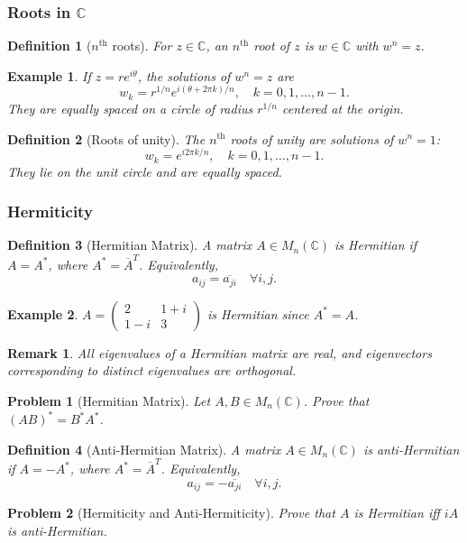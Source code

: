 \documentclass{article}
\newtheorem{definition}{Definition}
\newtheorem{problem}{Problem}
\newtheorem*{example}{Example}
\newtheorem{remark}{Remark}
\begin{document}
\subsubsection{Roots in $\mathbb{C}$}
\begin{definition}[$n^{\text{th}}$ roots]
    For $z \in \mathbb{C}$, an $n^{\text{th}}$ root of $z$ is $w \in \mathbb{C}$ with $w^n = z$.
\end{definition}
\begin{example}
    If $z = re^{i\theta}$, the solutions of $w^n = z$ are
    \[w_k = r^{1/n} e^{i(\theta + 2\pi k)/n}, \quad k = 0,1,\ldots,n-1.\]
    They are equally spaced on a circle of radius $r^{1/n}$ centered at the origin.
\end{example}
\begin{definition}[Roots of unity]
    The $n^{\text{th}}$ roots of unity are solutions of $w^n = 1$:
    \[w_k = e^{i2\pi k/n}, \quad k = 0,1,\ldots,n-1.\]
    They lie on the unit circle and are equally spaced.
\end{definition}

\subsubsection{Hermiticity}
\begin{definition}[Hermitian Matrix]
    A matrix $A \in M_n(\mathbb{C})$ is Hermitian if $A = A^\ast$, where $A^\ast = \overline{A}^T$. Equivalently,
    \[a_{ij} = \overline{a_{ji}} \quad \forall i,j.\]
\end{definition}
\begin{example}
    $A = \begin{pmatrix}2 & 1+i \\ 1-i & 3\end{pmatrix}$ is Hermitian since $A^\ast = A$.
\end{example}
\begin{remark}
    All eigenvalues of a Hermitian matrix are real, and eigenvectors corresponding to distinct eigenvalues are orthogonal.
\end{remark}
\begin{problem}[Hermitian Matrix]
    Let $A,B \in M_n(\mathbb{C})$. Prove that $(AB)^\ast = B^\ast A^\ast$.
\end{problem}
\begin{definition}[Anti-Hermitian Matrix]
    A matrix $A \in M_n(\mathbb{C})$ is anti-Hermitian if $A = -A^\ast$, where $A^\ast = \overline{A}^T$. Equivalently,
    \[a_{ij} = -\overline{a_{ji}} \quad \forall i,j.\]
\end{definition}
\begin{problem}[Hermiticity and Anti-Hermiticity]
    Prove that $A$ is Hermitian iff $iA$ is anti-Hermitian.
\end{problem}
\end{document}
